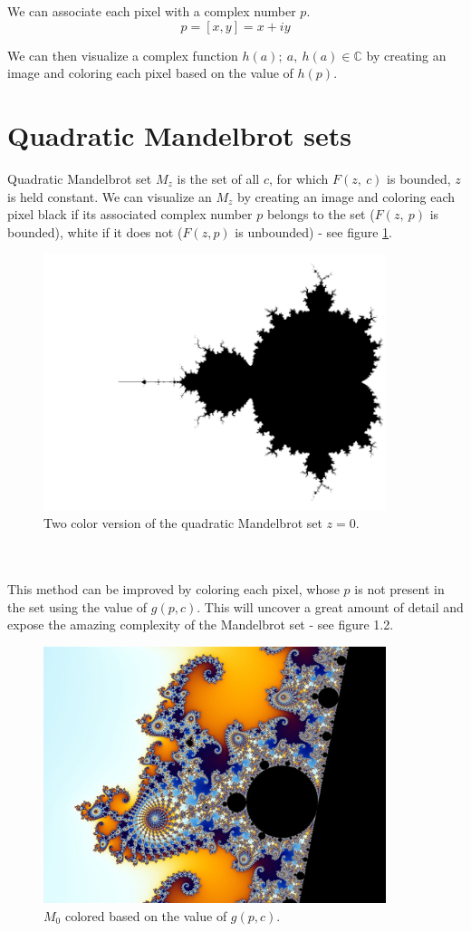 \documentclass[11pt,a4paper,twoside,openright]{report}
\begin{document}
We can associate each pixel with a complex number $p$.
\[p = [x,y] = x + iy \]

We can then visualize a complex function $h(a);\: a,\:h(a) \in \mathbb{C}$ by creating an image and coloring each pixel based on the value of $h(p)$.

\section{Quadratic Mandelbrot sets}
Quadratic Mandelbrot set $M_z$ is the set of all $c$, for which $F(z,\:c)$ is bounded, $z$ is held constant. \cite{mandelbrot_set} We can visualize an $M_z$ by creating an image and coloring each pixel black if its associated complex number $p$ belongs to the set ($F(z,\:p)$ is bounded), white if it does not ($F(z,p)$ is unbounded) - see figure \ref{fig:mandelbrot_b&w}.
\begin{figure}[ht]
    \includegraphics[width=10cm]{img/mandelbrot_b&w.png}
    \centering
    \caption{Two color version of the quadratic Mandelbrot set $z=0$. \cite{mandelbrot_b&w}}
    \label{fig:mandelbrot_b&w}
\end{figure}
\\ \\
This method can be improved by coloring each pixel, whose $p$ is not present in the set using the value of $g(p, c)$. This will uncover a great amount of detail and expose the amazing complexity of the Mandelbrot set - see figure 1.2.

\begin{figure}[ht]
    \includegraphics[width=10cm]{img/mandelbrot_color.jpg}
    \centering
    \caption{$M_0$ colored based on the value of $g(p,c)$. \cite{mandelbrot_color}}
    \label{fig:mandelbrot_color}
\end{figure}
\end{document}

